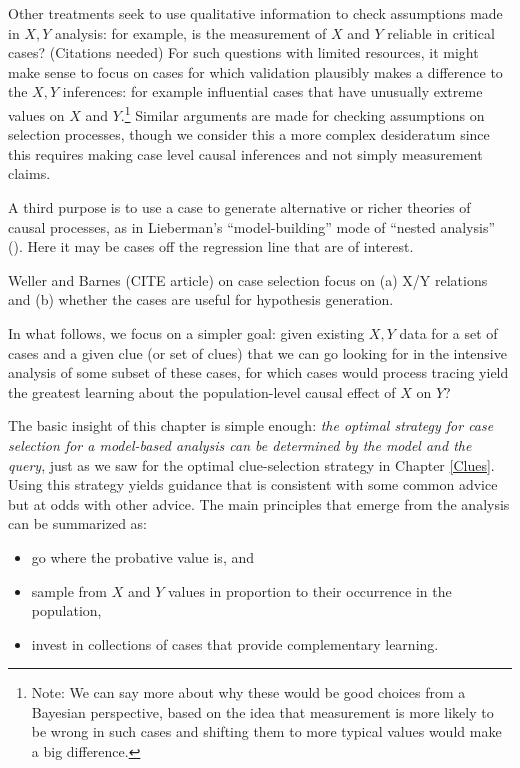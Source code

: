 \documentclass[12pt,]{book}
\providecommand{\tightlist}{%
  \setlength{\itemsep}{0pt}\setlength{\parskip}{0pt}}
\let\rmarkdownfootnote\footnote%
\def\footnote{\protect\rmarkdownfootnote}
\begin{document}
Other treatments seek to use qualitative information to check assumptions made in \(X, Y\) analysis: for example, is the measurement of \(X\) and \(Y\) reliable in critical cases? (Citations needed) For such questions with limited resources, it might make sense to focus on cases for which validation plausibly makes a difference to the \(X,Y\) inferences: for example influential cases that have unusually extreme values on \(X\) and \(Y\).\footnote{Note: We can say more about why these would be good choices from a Bayesian perspective, based on the idea that measurement is more likely to be wrong in such cases and shifting them to more typical values would make a big difference.} Similar arguments are made for checking assumptions on selection processes, though we consider this a more complex desideratum since this requires making case level causal inferences and not simply measurement claims.

A third purpose is to use a case to generate alternative or richer theories of causal processes, as in Lieberman's ``model-building'' mode of ``nested analysis'' (\citet{Lieberman2005nested}). Here it may be cases off the regression line that are of interest.

Weller and Barnes (CITE article) on case selection focus on (a) X/Y relations and (b) whether the cases are useful for hypothesis generation.

In what follows, we focus on a simpler goal: given existing \(X, Y\) data for a set of cases and a given clue (or set of clues) that we can go looking for in the intensive analysis of some subset of these cases, for which cases would process tracing yield the greatest learning about the population-level causal effect of \(X\) on \(Y\)?

The basic insight of this chapter is simple enough: \emph{the optimal strategy for case selection for a model-based analysis can be determined by the model and the query}, just as we saw for the optimal clue-selection strategy in Chapter \ref{Clues}. Using this strategy yields guidance that is consistent with some common advice but at odds with other advice. The main principles that emerge from the analysis can be summarized as:

\begin{itemize}
\tightlist
\item
  go where the probative value is, and
\item
  sample from \(X\) and \(Y\) values in proportion to their occurrence in the population,
\item
  invest in collections of cases that provide complementary learning.
\end{itemize}
\end{document}
